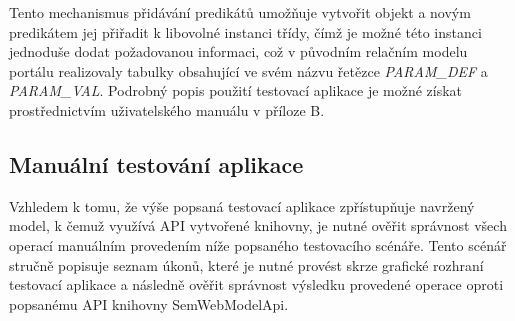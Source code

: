 \documentclass{projekt}
\begin{document}
Tento mechanismus přidávání predikátů umožňuje vytvořit objekt a novým predikátem jej přiřadit k libovolné instanci třídy, čímž je možné této instanci jednoduše dodat požadovanou informaci, což v původním relačním modelu portálu realizovaly tabulky obsahující ve svém názvu řetězce {\it PARAM\_DEF} a {\it PARAM\_VAL}. Podrobný popis použití testovací aplikace je možné získat prostřednictvím uživatelského manuálu v příloze B.

\subsection{Manuální testování aplikace}
\hspace{0.65cm}Vzhledem k tomu, že výše popsaná testovací aplikace zpřístupňuje navržený model, k čemuž využívá API vytvořené knihovny, je nutné ověřit správnost všech operací manuálním provedením níže popsaného testovacího scénáře. Tento scénář stručně popisuje seznam úkonů, které je nutné provést skrze grafické rozhraní testovací aplikace a následně ověřit správnost výsledku provedené operace oproti popsanému API knihovny SemWebModelApi.
\end{document}
